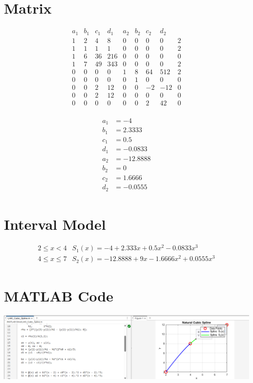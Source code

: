 \documentclass[legalpaper,11pt,extrafontsizes,oneside,openany,x11names]{memoir}
\begin{document}
\section*{Matrix}

\[
\begin{array}{cccccccc|c}
a_1 & b_1 & c_1 & d_1 & a_2 & b_2 & c_2 & d_2 & \\
\hline
1 & 2 & 4 & 8 & 0 & 0 & 0 & 0 & 2 \\
1 & 1 & 1 & 1 & 0 & 0 & 0 & 0 & 2 \\
1 & 6 & 36 & 216 & 0 & 0 & 0 & 0 & 0 \\
1 & 7 & 49 & 343 & 0 & 0 & 0 & 0 & 2 \\
0 & 0 & 0 & 0 & 1 & 8 & 64 & 512 & 2 \\
0 & 0 & 0 & 0 & 0 & 1 & 0 & 0 & 0 \\
0 & 0 & 2 & 12 & 0 & 0 & -2 & -12 & 0 \\
0 & 0 & 2 & 12 & 0 & 0 & 0 & 0 & 0 \\
0 & 0 & 0 & 0 & 0 & 0 & 2 & 42 & 0 \\
\end{array}
\]

\[
\begin{aligned}
a_1 &= -4 \\
b_1 &= 2.3333 \\
c_1 &= 0.5 \\
d_1 &= -0.0833 \\
a_2 &= -12.8888 \\
b_2 &= 0 \\
c_2 &= 1.6666 \\
d_2 &= -0.0555 \\
\end{aligned}
\]

\section*{Interval Model}

\[
\begin{array}{ll}
2 \leq x < 4 & S_1(x) = -4 + 2.333x + 0.5x^2 - 0.0833x^3 \\
4 \leq x \leq 7 & S_2(x) = -12.8888 + 9x - 1.6666x^2 + 0.0555x^3 \\
\end{array}
\]

\section*{MATLAB Code}
\includegraphics[width=\textwidth]{assets/cspline.png}
\end{document}
